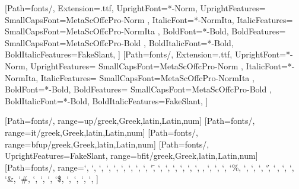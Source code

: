 \usepackage[mathrm=sym, mathit=sym, mathsf=sym, mathbf=sym]{unicode-math}
\setmainfont{MetaOffcPro}[Path=fonts/,
	Extension=.ttf,
	UprightFont=*-Norm,
	UprightFeatures={
		SmallCapsFont={MetaScOffcPro-Norm}
	},
	ItalicFont=*-NormIta,
	ItalicFeatures={
		SmallCapsFont={MetaScOffcPro-NormIta}
	},
	BoldFont=*-Bold,
	BoldFeatures={
		SmallCapsFont={MetaScOffcPro-Bold}
	},
	BoldItalicFont=*-Bold,
	BoldItalicFeatures={FakeSlant},
]
\setsansfont{MetaOffcPro}[Path=fonts/,
	Extension=.ttf,
	UprightFont=*-Norm,
	UprightFeatures={
		SmallCapsFont={MetaScOffcPro-Norm}
	},
	ItalicFont=*-NormIta,
	ItalicFeatures={
		SmallCapsFont={MetaScOffcPro-NormIta}
	},
	BoldFont=*-Bold,
	BoldFeatures={
		SmallCapsFont={MetaScOffcPro-Bold}
	},
	BoldItalicFont=*-Bold,
	BoldItalicFeatures={FakeSlant},
]

[Path=fonts/,
	range=up/{greek,Greek,latin,Latin,num}]
[Path=fonts/,
	range=it/{greek,Greek,latin,Latin,num}]
[Path=fonts/,
	range=bfup/{greek,Greek,latin,Latin,num}]
[Path=fonts/, UprightFeatures={FakeSlant},
	range=bfit/{greek,Greek,latin,Latin,num}]
[Path=fonts/,
	range={`\+, `\-, `\×, `\÷, `\⋅, `\*, `\/, `\⁄, `\±,
		`\=, `\≠, `\≈, `\<, `\>, `\≤, `\≥, \partial, `\∞, `\†, `\‡,
		`\%, `\‰, `\!, `\?, `\., `\,, `\:, `\;, `\&, `\#, `\@,
		`\§, `\€, `\$, `\£, `\¥, `\©, `\®,
	}
]
